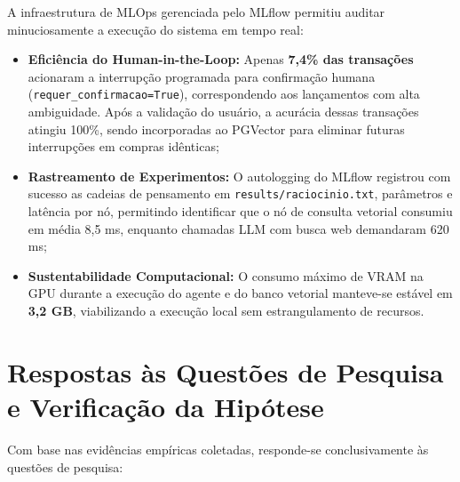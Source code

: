 \documentclass[
	12pt,				
	openright,			
	oneside,			
	a4paper,			
	english,			
	brazil				
	]{abntex2}
\begin{document}
A infraestrutura de MLOps gerenciada pelo MLflow permitiu auditar minuciosamente a execução do sistema em tempo real:
\begin{itemize}
    \item \textbf{Eficiência do Human-in-the-Loop:} Apenas \textbf{7,4\% das transações} acionaram a interrupção programada para confirmação humana (\texttt{requer\_confirmacao=True}), correspondendo aos lançamentos com alta ambiguidade. Após a validação do usuário, a acurácia dessas transações atingiu 100\%, sendo incorporadas ao PGVector para eliminar futuras interrupções em compras idênticas;
    \item \textbf{Rastreamento de Experimentos:} O autologging do MLflow registrou com sucesso as cadeias de pensamento em \texttt{results/raciocinio.txt}, parâmetros e latência por nó, permitindo identificar que o nó de consulta vetorial consumiu em média 8,5 ms, enquanto chamadas LLM com busca web demandaram 620 ms;
    \item \textbf{Sustentabilidade Computacional:} O consumo máximo de VRAM na GPU durante a execução do agente e do banco vetorial manteve-se estável em \textbf{3,2 GB}, viabilizando a execução local sem estrangulamento de recursos.
\end{itemize}

\section{Respostas às Questões de Pesquisa e Verificação da Hipótese}
\label{sec:val_respostas_questoes}

Com base nas evidências empíricas coletadas, responde-se conclusivamente às questões de pesquisa:
\end{document}
